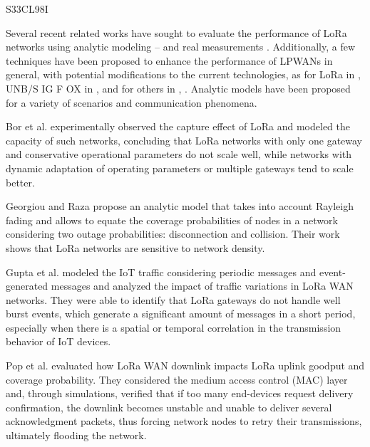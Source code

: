 \cite{hoeller_analysis_2018} S33CL98I

Several recent related works have sought to evaluate the performance of LoRa networks using analytic modeling  \cite{georgiou_low_2017}–  \cite{bor_lora_2016}
\cite{gupta_modelling_2017}
\cite{pop_does_2017}
\cite{bankov_mathematical_2017}
and real measurements  \cite{petajajarvi_performance_2017}
\cite{petajajarvi_evaluation_2017}
\cite{wang_performance_2017}
\cite{neumann_indoor_2016}
\cite{angrisani_lora_2017}
\cite{jorke_urban_2017}
\cite{radcliffe_usability_2017}
\cite{rizzi_evaluation_2017}
\cite{oliveira_long_2017}.
Additionally,
	a few techniques have been proposed to enhance the performance of LPWANs in general,
	with potential modifications to the current technologies,
	as for LoRa in \cite{cuomo_explora_2017}
\cite{bor_lora_2017}
\cite{qin_resource_2017}
\cite{voigt_mitigating_2016},
	UNB/S IG F OX in \cite{mo_optimization_2016},
	and for others in \cite{song_evaluation_2017},
	\cite{magrin_performance_2017}.
Analytic models have been proposed for a variety of scenarios and communication phenomena.

Bor et al.
\cite{bor_lora_2016} experimentally observed the capture effect of LoRa and modeled the capacity of such networks,
	concluding that LoRa networks with only one gateway and conservative operational parameters do not scale well,
	while networks with dynamic adaptation of operating parameters or multiple gateways tend to scale better.

Georgiou and Raza \cite{georgiou_low_2017} propose an analytic model that takes into account Rayleigh fading and allows to equate the coverage probabilities of nodes in a network considering two outage probabilities:
	disconnection and collision.
Their work shows that LoRa networks are sensitive to network density.

Gupta et al.
\cite{gupta_modelling_2017} modeled the IoT traffic considering periodic messages and event-generated messages and analyzed the impact of traffic variations in LoRa WAN networks.
They were able to identify that LoRa gateways do not handle well burst events,
	which generate a significant amount of messages in a short period,
	especially when there is a spatial or temporal correlation in the transmission behavior of IoT devices.

Pop et al.
\cite{pop_does_2017} evaluated how LoRa WAN downlink impacts LoRa uplink goodput and coverage probability.
They considered the medium access control (MAC) layer and,
	through simulations,
	verified that if too many end-devices request delivery confirmation,
	the downlink becomes unstable and unable to deliver several acknowledgment packets,
	thus forcing network nodes to retry their transmissions,
	ultimately flooding the network.

